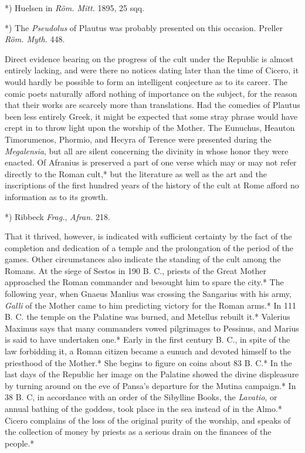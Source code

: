 \documentclass[a4paper, 11pt, oneside, polutonikogreek, english]{article}
\begin{document}
*) Huelsen in \emph{Röm. Mitt.} 1895, 25 sqq.

*) The \emph{Pseudolus} of Plautus was probably presented on this occasion. Preller \emph{Röm. Myth.} 448.

Direct evidence bearing on the progress of the cult under the Republic is almost entirely lacking, and were there no notices dating later than the time of Cicero, it would hardly be possible to form an intelligent conjecture as to its career. The comic poets naturally afford nothing of importance on the subject, for the reason that their works are scarcely more than translations. Had the comedies of Plautus been less entirely Greek, it might be expected that some stray phrase would have crept in to throw light upon the worship of the Mother. The Eunuchus, Heauton Timorumenos, Phormio, and Hecyra of Terence were presented during the \emph{Megalensia}, but all are silent concerning the divinity in whose honor they were enacted. Of Afranius is preserved a part of one verse which may or may not refer directly to the Roman cult,* but the literature as well as the art and the inscriptions of the first hundred years of the history of the cult at Rome afford no information as to its growth.

*) Ribbeck \emph{Frag.}, \emph{Afran.} 218.

That it thrived, however, is indicated with sufficient certainty by the fact of the completion and dedication of a temple and the prolongation of the period of the games. Other circumstances also indicate the standing of the cult among the Romans. At the siege of Sestos in 190 B. C., priests of the Great Mother approached the Roman commander and besought him to spare the city.* The following year, when Gnaeus Manlius was crossing the Sangarius with his army, \emph{Galli} of the Mother came to him predicting victory for the Roman arms.* In 111 B. C. the temple on the Palatine was burned, and Metellus rebuilt it.* Valerius Maximus says that many commanders vowed pilgrimages to Pessinus, and Marius is said to have undertaken one.* Early in the first century B. C., in spite of the law forbidding it, a Roman citizen became a eunuch and devoted himself to the priesthood of the Mother.* She begins to figure on coins about 83 B. C.* In the last days of the Republic her image on the Palatine showed the divine displeasure by turning around on the eve of Pansa's departure for the Mutina campaign.* In 38 B. C, in accordance with an order of the Sibylline Books, the \emph{Lavatio}, or annual bathing of the goddess, took place in the sea instead of in the Almo.* Cicero complains of the loss of the original purity of the worship, and speaks of the collection of money by priests as a serious drain on the finances of the people.*
\end{document}
